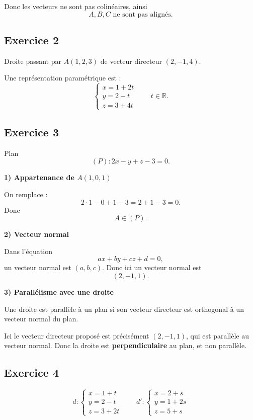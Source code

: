\documentclass[11pt,a4paper]{article}
\newcommand{\R}{\mathbb{R}}
\begin{document}
Donc les vecteurs ne sont pas colinéaires, ainsi
\[
\boxed{A,B,C \text{ ne sont pas alignés}.}
\]

\subsection*{Exercice 2}
Droite passant par \(A(1,2,3)\) de vecteur directeur \((2,-1,4)\).

Une représentation paramétrique est :
\[
\boxed{
\begin{cases}
x=1+2t\\
y=2-t\\
z=3+4t
\end{cases}
\qquad t\in\R.
}
\]

\subsection*{Exercice 3}
Plan
\[
(P): 2x-y+z-3=0.
\]

\textbf{1) Appartenance de \(A(1,0,1)\)}

On remplace :
\[
2\cdot1-0+1-3=2+1-3=0.
\]
Donc
\[
A\in (P).
\]

\textbf{2) Vecteur normal}

Dans l'équation
\[
ax+by+cz+d=0,
\]
un vecteur normal est \((a,b,c)\). Donc ici un vecteur normal est
\[
\boxed{(2,-1,1).}
\]

\textbf{3) Parallélisme avec une droite}

Une droite est parallèle à un plan si son vecteur directeur est orthogonal à un vecteur normal du plan.

Ici le vecteur directeur proposé est précisément \((2,-1,1)\), qui est parallèle au vecteur normal.  
Donc la droite est \textbf{perpendiculaire} au plan, et non parallèle.

\subsection*{Exercice 4}
\[
d:\begin{cases}
x=1+t\\
y=2-t\\
z=3+2t
\end{cases}
\qquad
d':\begin{cases}
x=2+s\\
y=1+2s\\
z=5+s
\end{cases}
\]
\end{document}
